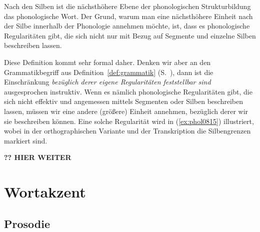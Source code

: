 Nach den Silben ist die nächsthöhere Ebene der phonologischen Strukturbildung das phonologische Wort.
Der Grund, warum man eine nächsthöhere Einheit nach der Silbe innerhalb der Phonologie annehmen möchte, ist, dass es phonologische Regularitäten gibt, die sich nicht nur mit Bezug auf Segmente und einzelne Silben beschreiben lassen.


Diese Definition kommt sehr formal daher.
Denken wir aber an den Grammatikbegriff aus Definition~\ref{def:grammatik} (S.~\pageref{def:grammatik}), dann ist die Einschränkung \textit{bezüglich derer eigene Regularitäten feststellbar sind} ausgesprochen instruktiv.
Wenn es nämlich phonologische Regularitäten gibt, die sich nicht effektiv und angemessen mittels Segmenten oder Silben beschreiben lassen, müssen wir eine andere (größere) Einheit annehmen, bezüglich derer wir sie beschreiben können.
Eine solche Regularität wird in (\ref{ex:phol0815}) illustriert, wobei in der orthographischen Variante und der Transkription die Silbengrenzen markiert sind.

\begin{exe}
  \ex\label{ex:phol0815}
  \begin{xlist}
  \end{xlist}
\end{exe}

\textbf{?? HIER WEITER}






\section{Wortakzent}

\label{sec:prosodie}


\subsection{Prosodie}


